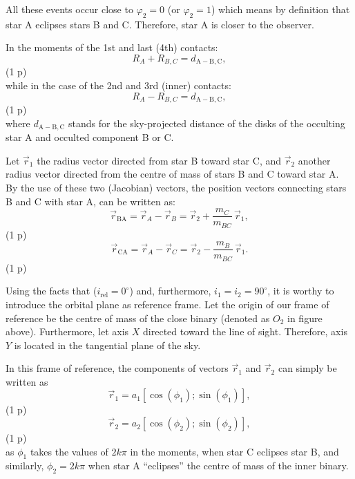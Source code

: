 \begin{description}
\begin{description}
    All these events occur close to $\varphi_2 = 0$ (or $\varphi_2 = 1$)
    which means by definition that star A eclipses stars B and C. Therefore,
    star A is closer to the observer.

  \item[c)] In the moments of the 1st and last (4th) contacts:
    \[ R_A + R_{B,C} = d_{\mathrm{A-B,C}},
       \tag*{(2.1)} \]
    \hfill(1 p)\\
    while in the case of the 2nd and 3rd (inner) contacts:
    \[ R_A - R_{B,C} = d_{\mathrm{A-B,C}},
       \tag*{(2.2)} \]
    \hfill(1 p)\\
    where $d_{\mathrm{A-B,C}}$ stands for the sky-projected distance of the
    disks of the occulting star A and occulted component B or C.

    Let $\vec{r}_1$ the radius vector directed from star B toward star C,
    and $\vec{r}_2$ another radius vector directed from the centre of mass
    of stars B and C toward star A. By the use of these two (Jacobian)
    vectors, the position vectors connecting stars B and C with star A, can
    be written as:
    \[ \vec{r}_{\mathrm{BA}} = \vec{r}_A - \vec{r}_B
       = \vec{r}_2 + \frac{m_C}{m_{BC}}\,\vec{r}_1,
       \tag*{(2.3)} \]
    \hfill(1 p)
    \[ \vec{r}_{\mathrm{CA}} = \vec{r}_A - \vec{r}_C
       = \vec{r}_2 - \frac{m_B}{m_{BC}}\,\vec{r}_1.
       \tag*{(2.4)} \]
    \hfill(1 p)

    Using the facts that ($i_{\mathrm{rel}} = 0^\circ$) and, furthermore,
    $i_1 = i_2 = 90^\circ$, it is worthy to introduce the orbital plane as
    reference frame. Let the origin of our frame of reference be the centre
    of mass of the close binary (denoted as $O_2$ in figure above).
    Furthermore, let axis $X$ directed toward the line of sight. Therefore,
    axis $Y$ is located in the tangential plane of the sky.

    In this frame of reference, the components of vectors $\vec{r}_1$ and
    $\vec{r}_2$ can simply be written as
    \[ \vec{r}_1 = a_1 \left[ \cos(\phi_1); \sin(\phi_1) \right],
       \tag*{(2.5)} \]
    \hfill(1 p)
    \[ \vec{r}_2 = a_2 \left[ \cos(\phi_2); \sin(\phi_2) \right],
       \tag*{(2.6)} \]
    \hfill(1 p)\\
    as $\phi_1$ takes the values of $2k\pi$ in the moments, when star C
    eclipses star B, and similarly, $\phi_2 = 2k\pi$ when star A
    ``eclipses'' the centre of mass of the inner binary.


\end{description}
\end{description}
